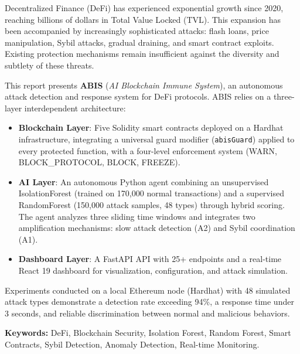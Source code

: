 \documentclass[12pt,a4paper]{report}
\newcommand{\code}[1]{\texttt{#1}}
\begin{document}
Decentralized Finance (DeFi) has experienced exponential growth since 2020, reaching billions of dollars in Total Value Locked (TVL). This expansion has been accompanied by increasingly sophisticated attacks: flash loans, price manipulation, Sybil attacks, gradual draining, and smart contract exploits. Existing protection mechanisms remain insufficient against the diversity and subtlety of these threats.

This report presents \textbf{ABIS} (\textit{AI Blockchain Immune System}), an autonomous attack detection and response system for DeFi protocols. ABIS relies on a three-layer interdependent architecture:

\begin{itemize}
  \item \textbf{Blockchain Layer}: Five Solidity smart contracts deployed on a Hardhat infrastructure, integrating a universal guard modifier (\code{abisGuard}) applied to every protected function, with a four-level enforcement system (WARN, BLOCK\_PROTOCOL, BLOCK, FREEZE).
  \item \textbf{AI Layer}: An autonomous Python agent combining an unsupervised IsolationForest (trained on 170,000 normal transactions) and a supervised RandomForest (150,000 attack samples, 48 types) through hybrid scoring. The agent analyzes three sliding time windows and integrates two amplification mechanisms: slow attack detection (A2) and Sybil coordination (A1).
  \item \textbf{Dashboard Layer}: A FastAPI API with 25+ endpoints and a real-time React 19 dashboard for visualization, configuration, and attack simulation.
\end{itemize}

Experiments conducted on a local Ethereum node (Hardhat) with 48 simulated attack types demonstrate a detection rate exceeding 94\%, a response time under 3 seconds, and reliable discrimination between normal and malicious behaviors.

\textbf{Keywords:} DeFi, Blockchain Security, Isolation Forest, Random Forest, Smart Contracts, Sybil Detection, Anomaly Detection, Real-time Monitoring.

\newpage
\tableofcontents

\newpage
\listoffigures
{}

\newpage
\listoftables
{}
\end{document}
